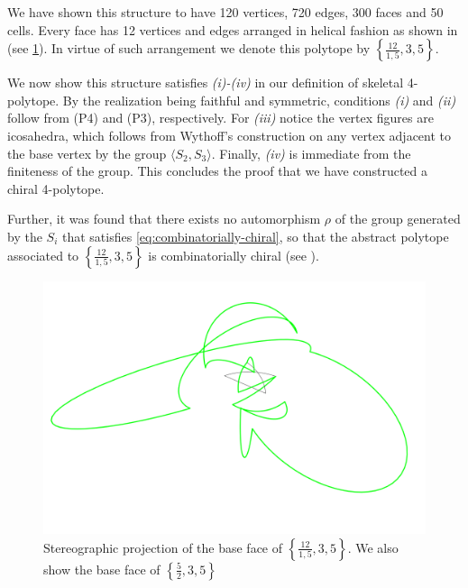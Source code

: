 \documentclass{article}
\theoremstyle{definition}
\DeclareMathOperator{\Stab}{Stab}
\begin{document}
	We have shown this structure to have 120 vertices, 720 edges, 300 faces and 50 cells. Every face has 12 vertices and edges arranged in helical fashion as shown in \cite{petcox} (see \cref{fig:12}). In virtue of such arrangement we denote this polytope by $\left\{\frac{12}{1,5},3,5\right\}$.
	
	
	We now show this structure satisfies \textit{(i)-(iv)} in our definition of skeletal 4-polytope. By the realization being faithful and symmetric, conditions \textit{(i)} and \textit{(ii)} follow from (P4) and (P3), respectively. For \textit{(iii)} notice the vertex figures are icosahedra, which follows from Wythoff's construction on any vertex adjacent to the base vertex by the group $\langle S_2,S_3\rangle$. Finally, \textit{(iv)} is immediate from the finiteness of the group. This concludes the proof that we have constructed a chiral 4-polytope.
	
	
	Further, it was found that there exists no automorphism $\rho$ of the group generated by the $S_i$ that satisfies \cref{eq:combinatorially-chiral}, so that the abstract polytope associated to $\left\{\frac{12}{1,5},3,5\right\}$ is combinatorially chiral (see ).
	
	

\begin{figure}[H]
	\begin{center}
			\centering
			\includegraphics[width=1\linewidth]{fig2}
			\caption{Stereographic projection of the base face of  $\left\{\frac{12}{1,5},3,5\right\}$. We also show the base face of $\left\{\frac{5}{2},3,5\right\}$}\label{fig:12}
	\end{center}
\end{figure}
\end{document}
